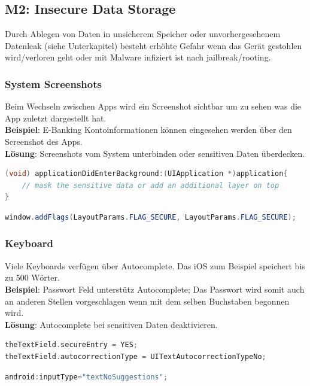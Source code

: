 \subsection{M2: Insecure Data Storage}
Durch Ablegen von Daten in unsicherem Speicher oder unvorhergesehenem Datenleak (siehe Unterkapitel) besteht erhöhte Gefahr wenn das Gerät gestohlen wird/verloren geht oder mit Malware infiziert ist nach jailbreak/rooting.

\subsubsection{System Screenshots}
Beim Wechseln zwischen Apps wird ein Screenshot sichtbar um zu sehen was die App zuletzt dargestellt hat. \\

\textbf{Beispiel}: E-Banking Kontoinformationen können eingesehen werden über den Screenshot des Apps. \\

\textbf{Lösung}: Screenshots vom System unterbinden oder sensitiven Daten überdecken.
\begin{lstlisting}[language=C, caption=Lösung für iOS]
(void) applicationDidEnterBackground:(UIApplication *)application{
	// mask the sensitive data or add an additional layer on top			
}
\end{lstlisting}
\begin{lstlisting}[language=Java, caption=Lösung für Android]
window.addFlags(LayoutParams.FLAG_SECURE, LayoutParams.FLAG_SECURE);
\end{lstlisting}

\subsubsection{Keyboard}
Viele Keyboards verfügen über Autocomplete. Das iOS zum Beispiel speichert bis zu 500 Wörter.\\

\textbf{Beispiel}: Passwort Feld unterstütz Autocomplete; Das Passwort wird somit auch an anderen Stellen vorgeschlagen wenn mit dem selben Buchstaben begonnen wird. \\

\textbf{Lösung}: Autocomplete bei sensitiven Daten deaktivieren.
\begin{lstlisting}[language=C, caption=Lösung für iOS]
theTextField.secureEntry = YES;
theTextField.autocorrectionType = UITextAutocorrectionTypeNo;
\end{lstlisting}
\begin{lstlisting}[language=Java, caption=Lösung für Android]
android:inputType="textNoSuggestions";
\end{lstlisting}

